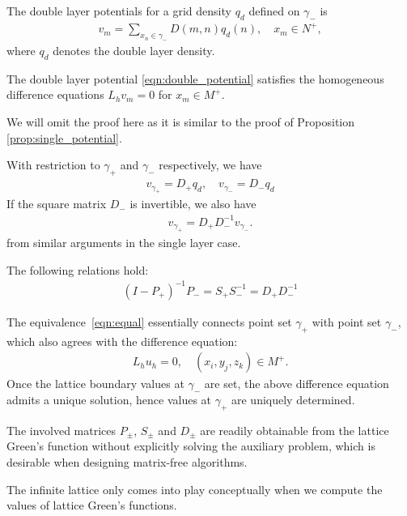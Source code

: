 The double layer potentials for a grid density $q_d$ defined on $\gamma_-$ is 
\begin{align}\label{eqn:double_potential}
v_m=\sum_{x_n\in\gamma_-}D(m,n)q_d(n),\quad x_m\in N^+,
\end{align}
where $q_d$ denotes the double layer density.

\begin{proposition}
The double layer potential \eqref{eqn:double_potential} satisfies the homogeneous difference equations $L_hv_m=0$ for $x_m\in M^+$.
\end{proposition}
We will omit the proof here as it is similar to the proof of Proposition \ref{prop:single_potential}.

With restriction to $\gamma_+$ and $\gamma_-$ respectively, we have
\begin{align}
v_{\gamma_+}=D_+q_{d},\quad v_{\gamma_-}=D_-q_{d}
\end{align}
If the square matrix $D_-$ is invertible, we also have
\begin{align}
v_{\gamma_+} = D_+D_{-}^{-1}v_{\gamma_-}.
\end{align}
from similar arguments in the single layer case.

\begin{proposition}
The following relations hold:
\begin{align}\label{eqn:equal}
(I-P_+)^{-1}P_- = S_+S_{-}^{-1}=D_+D_{-}^{-1}
\end{align}
\end{proposition}

The equivalence~\eqref{eqn:equal} essentially connects point set $\gamma_{+}$ with point set $\gamma_{-}$, which also agrees with the difference equation:
\begin{align}
L_hu_h = 0, \quad (x_i,y_j,z_k)\in M^+.
\end{align}
Once the lattice boundary values at $\gamma_{-}$ are set, the above difference equation admits a unique solution, hence values at $\gamma_{+}$ are uniquely determined.

\begin{remark}
The involved matrices $P_\pm$, $S_\pm$ and $D_\pm$ are readily obtainable from the lattice Green's function without explicitly solving the auxiliary problem, which is desirable when designing matrix-free algorithms.
\end{remark}

\begin{remark}
The infinite lattice only comes into play conceptually when we compute the values of lattice Green's functions.
\end{remark}

